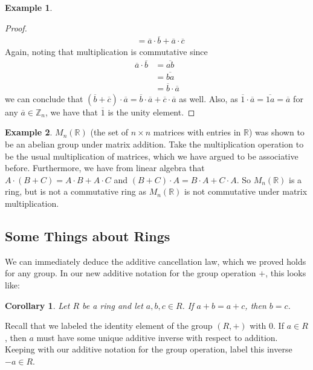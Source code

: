 \documentclass[12pt,letterpaper,DIV=11,final]{scrartcl}
\theoremstyle{plain}
\newtheorem{corollary}{Corollary}
\theoremstyle{definition}
\newtheorem{example}{Example}[section]
\theoremstyle{remark}
\begin{document}
\begin{example}
\begin{proof}
\begin{align*}
                                                       &= \overline{a} \cdot \overline{b} + \overline{a} \cdot \overline{c}
    \end{align*}
    Again, noting that multiplication is commutative since
    \begin{align*}
      \overline{a} \cdot \overline{b} &= \overline{ab} \\
                                      &= \overline{ba} \\
                                      &= \overline{b} \cdot \overline{a}
    \end{align*}
    we can conclude that $(\overline{b} + \overline{c}) \cdot \overline{a} = \overline{b} \cdot \overline{a} + \overline{c} \cdot \overline{a}$ as well.
    Also, as $\overline{1} \cdot \overline{a} = \overline{1a} = \overline{a}$ for any $\overline{a} \in \mathbb{Z}_n$, we have that $\overline{1}$ is the unity element.
  \end{proof}
\end{example}

\begin{example}
  $M_n(\mathbb{R})$ (the set of $n \times n$ matrices with entries in $\mathbb{R}$) was shown to be an abelian group under matrix addition.
  Take the multiplication operation to be the usual multiplication of matrices, which we have argued to be associative before.
  Furthermore, we have from linear algebra that $A \cdot (B + C) = A \cdot B + A \cdot C$ and $(B + C) \cdot A = B \cdot A + C \cdot A$.
  So $M_n(\mathbb{R})$ is a ring, but is not a commutative ring as $M_n(\mathbb{R})$ is not commutative under matrix multiplication.
\end{example}

\subsection{Some Things about Rings}
We can immediately deduce the additive cancellation law, which we proved holds for any group.
In our new additive notation for the group operation $+$, this looks like:

\begin{corollary}
  Let $R$ be a ring and let $a, b, c \in R$.
  If $a + b = a + c$, then $b = c$.
\end{corollary}

Recall that we labeled the identity element of the group $(R, +)$ with 0.
If $a \in R$, then $a$ must have some unique additive inverse with respect to addition.
Keeping with our additive notation for the group operation, label this inverse $-a \in R$.
\end{document}
